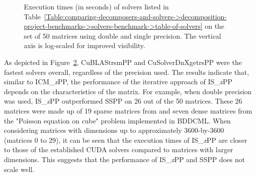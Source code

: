 \begin{figure}[ht!]
\begin{subfigure}{\textwidth}
		\label{Figure:comparing-decomposers-and-solvers->decomposition-project-benchmarks->solvers-benchmark->comparison-of-execution-times-on-all-matrices->single-precision}
	\end{subfigure}
	\caption{Execution times (in seconds) of solvers listed in Table~\ref{Table:comparing-decomposers-and-solvers->decomposition-project-benchmarks->solvers-benchmark->table-of-solvers} on the set of 50 matrices using double and single precision.
		The vertical axis is log-scaled for improved visibility.
	}
	\label{Figure:comparing-decomposers-and-solvers->decomposition-project-benchmarks->solvers-benchmark->comparison-of-execution-times-on-all-matrices->double-and-single-precision}
\end{figure}

As depicted in Figure~\ref{Figure:comparing-decomposers-and-solvers->decomposition-project-benchmarks->solvers-benchmark->comparison-of-execution-times-on-all-matrices->double-and-single-precision}, CuBLAStrsmPP and CuSolverDnXgetrsPP were the fastest solvers overall, regardless of the precision used.
The results indicate that, similar to ICM\_\textit{x}PP, the performance of the iterative approach of IS\_\textit{x}PP depends on the characteristics of the matrix.
For example, when double precision was used, IS\_\textit{x}PP outperformed SSPP on 26 out of the 50 matrices.
These 26 matrices were made up of 19 sparse matrices from  \cite{Davis2011} and seven dense matrices from the "Poisson equation on cube" problem implemented in BDDCML.
When considering matrices with dimensions up to approximately 3600-by-3600 (matrices 0 to 29), it can be seen that the execution times of IS\_\textit{x}PP are closer to those of the established CUDA solvers compared to matrices with larger dimensions.
This suggests that the performance of IS\_\textit{x}PP and SSPP does not scale well.

